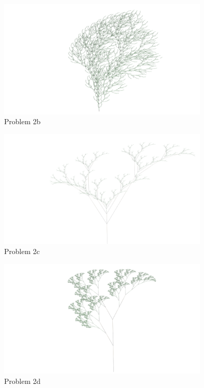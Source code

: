 \begin{figure}[H]
    \centering
    \includegraphics[width=0.90\textwidth]{figures/L-systems/b.png}
    \caption{Problem 2b}\label{fig:prob2b}
\end{figure}

\begin{figure}[H]
    \centering
    \includegraphics[width=0.90\textwidth]{figures/L-systems/c.png}
    \caption{Problem 2c}\label{fig:prob2c}
\end{figure}

\begin{figure}[H]
    \centering
    \includegraphics[width=0.90\textwidth]{figures/L-systems/d.png}
    \caption{Problem 2d}\label{fig:prob2d}
\end{figure}

